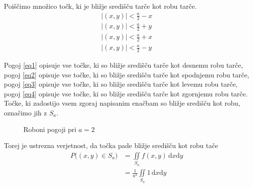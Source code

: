 \documentclass{amsart}
\theoremstyle{definition} %
\theoremstyle{plain} %
\begin{document}
Poiščimo množico točk, ki je bližje središču tarče kot robu tarče.
\begin{align}
    |(x,y)| < \frac{a}{2} - x \label{eq1} \\
    |(x,y)| < \frac{a}{2} + y \label{eq2} \\
    |(x,y)| < \frac{a}{2} + x \label{eq3} \\
    |(x,y)| < \frac{a}{2} - y \label{eq4}
\end{align}

Pogoj \eqref{eq1} opisuje vse točke, ki so bližje središču tarče kot desnemu robu tarče,
pogoj \eqref{eq2} opisuje vse točke, ki so bližje središču tarče kot spodnjemu robu tarče,
pogoj \eqref{eq3} opisuje vse točke, ki so bližje središču tarče kot levemu robu tarče,
pogoj \eqref{eq4} opisuje vse točke, ki so bližje središču tarče kot zgornjemu robu tarče.
Točke, ki zadostijo vsem zgoraj napisanim enačbam so bližje središču kot robu, označimo jih z $S_a$.
\begin{figure}[h!]
    \centering
    \caption{Roboni pogoji pri $a=2$}
\end{figure}

Torej je ustrezna verjetnost, da točka pade bližje središču kot robu tače
\begin{align*}
    P\big((x,y) \in S_a\big)
    &= \iint\limits_{S_a} f(x,y) \, \mathrm{d}x\mathrm{d}y \\
    &= \frac{1}{a^2}\iint\limits_{S_a} 1 \, \mathrm{d}x\mathrm{d}y
\end{align*}
\end{document}
